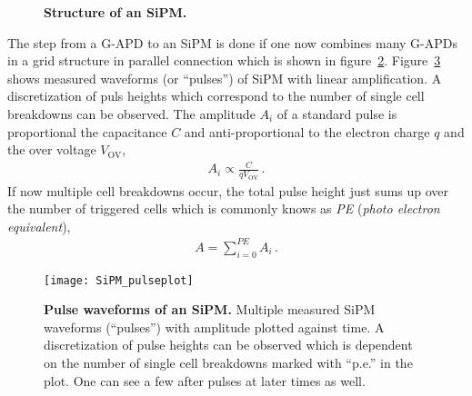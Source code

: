 \begin{figure}[H]
	\centering
	\begin{subfigure}[t]{0.62\textwidth}
		\label{sipm:iceact_sipm}
	\end{subfigure}
	\hfill
	\begin{subfigure}[t]{0.34\textwidth}
		\usebox{\savedimage}
	\end{subfigure}
	\caption[Structure of an SiPM]{\textbf{Structure of an SiPM.} \cite{sipm:datasheet}}
	\label{sipm:circuit_picture}
\end{figure}

The step from a G-APD to an SiPM is done if one now combines many G-APDs in a grid structure in parallel connection which is shown in figure~\ref{sipm:circuit_picture}. Figure~\ref{sipm:pulses} shows measured waveforms (or \enquote{pulses}) of SiPM with linear amplification. A discretization of puls heights which correspond to the number of single cell breakdowns can be observed. The amplitude $A_i$ of a standard pulse is proportional the capacitance $C$ and anti-proportional to the electron charge $q$ and the over voltage $V_\text{OV}$,~\cite{sipm:renker_lorenz}
\begin{align}
	A_i\propto\frac{C}{qV_\text{OV}}\,.
\end{align}
If now multiple cell breakdowns occur, the total pulse height just sums up over the number of triggered cells which is commonly knows as \textit{PE} (\textit{photo electron equivalent}),~\cite{sipm:renker_lorenz}
\begin{align} 
	A = \sum_{i=0}^{PE} A_i\,.
\end{align}

\begin{figure}[H]
	\centering
	\texttt{[image: SiPM\_pulseplot]}
	\caption[Pulse waveforms of an SiPM]{\textbf{Pulse waveforms of an SiPM.} \cite{sipm:hamamatsu_handbook} Multiple measured SiPM waveforms (\enquote{pulses}) with amplitude plotted against time. A discretization of pulse heights can be observed which is dependent on the number of single cell breakdowns marked with \enquote{p.e.} in the plot. One can see a few after pulses at later times as well.}
	\label{sipm:pulses}
\end{figure}

